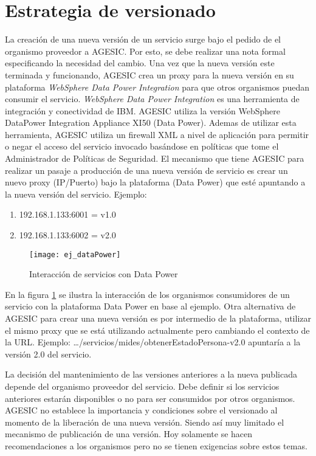 \section{Estrategia de versionado}
\label{Analisis:EstrategiaVersionado}
La creación de una nueva versión de un servicio surge bajo el pedido de el organismo proveedor a AGESIC. Por esto, se debe realizar una nota formal especificando la necesidad del cambio. 
Una vez que la nueva versión este terminada y funcionando, AGESIC crea un proxy para la nueva versión en su plataforma \emph{WebSphere Data Power Integration} para que otros organismos puedan consumir el servicio.
\emph{WebSphere Data Power Integration} es una herramienta de integración y conectividad de IBM. AGESIC utiliza la versión {WebSphere DataPower Integration Appliance XI50 (Data Power)}.
Ademas de utilizar esta herramienta, AGESIC utiliza un firewall XML a nivel de aplicación para permitir o negar el acceso del servicio invocado basándose en políticas que tome el Administrador de Políticas de Seguridad.
El mecanismo que tiene AGESIC para realizar un pasaje a producción de una nueva versión de servicio
es crear un nuevo proxy (IP/Puerto) bajo la plataforma (Data Power) que esté apuntando a la nueva versión del servicio.
Ejemplo:
				\begin{enumerate}
				\item 192.168.1.133:6001 	= v1.0
				\item 192.168.1.133:6002 	= v2.0
				\end{enumerate}

      \begin{figure}[h]
        \centering
        \texttt{[image: ej\_dataPower]}
        \caption{Interacción de servicios con Data Power}
        \label{figura:ej_dataPower}
      \end{figure}
En la figura \ref{figura:ej_dataPower} se ilustra la interacción de los organismos consumidores de un servicio con la plataforma Data Power en base al ejemplo.
Otra alternativa de AGESIC para crear una nueva versión es por intermedio de la plataforma, utilizar el mismo proxy que se está utilizando actualmente pero cambiando el contexto de la URL.
Ejemplo: …/servicios/mides/obtenerEstadoPersona-v2.0 apuntaría a la versión 2.0 del servicio.

La decisión del mantenimiento de las versiones anteriores a la nueva publicada depende del organismo proveedor del servicio. Debe definir si los servicios anteriores estarán disponibles o no para ser consumidos por otros organismos. AGESIC no establece la importancia y condiciones sobre el versionado al momento de la liberación de una nueva versión. Siendo  así muy limitado el mecanismo de publicación de una versión. Hoy solamente se hacen recomendaciones a los organismos pero no se tienen exigencias sobre estos temas.

